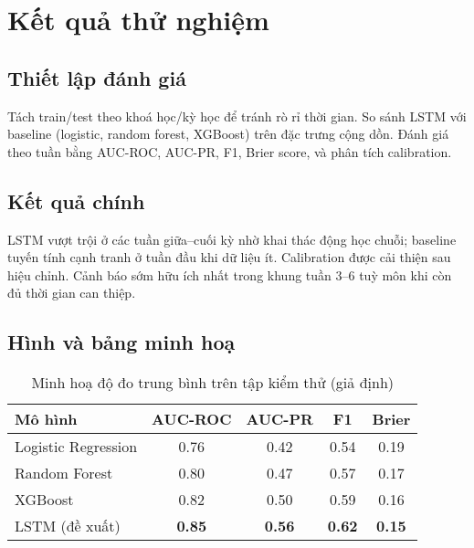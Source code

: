 \documentclass[12pt,a4paper]{article}
\begin{document}
\section{Kết quả thử nghiệm}
\subsection{Thiết lập đánh giá}
Tách train/test theo khoá học/kỳ học để tránh rò rỉ thời gian. So sánh LSTM với baseline (logistic, random forest, XGBoost) trên đặc trưng cộng dồn. Đánh giá theo tuần bằng AUC-ROC, AUC-PR, F1, Brier score, và phân tích calibration.

\subsection{Kết quả chính}
LSTM vượt trội ở các tuần giữa–cuối kỳ nhờ khai thác động học chuỗi; baseline tuyến tính cạnh tranh ở tuần đầu khi dữ liệu ít. Calibration được cải thiện sau hiệu chỉnh. Cảnh báo sớm hữu ích nhất trong khung tuần 3–6 tuỳ môn khi còn đủ thời gian can thiệp.

\subsection{Hình và bảng minh hoạ}

\begin{table}[H]
    \centering
    \caption{Minh hoạ độ đo trung bình trên tập kiểm thử (giả định)}
    \begin{tabular}{lcccc}
        \toprule
        Mô hình & AUC-ROC & AUC-PR & F1 & Brier \\
        \midrule
        Logistic Regression & 0.76 & 0.42 & 0.54 & 0.19 \\
        Random Forest & 0.80 & 0.47 & 0.57 & 0.17 \\
        XGBoost & 0.82 & 0.50 & 0.59 & 0.16 \\
        LSTM (đề xuất) & \textbf{0.85} & \textbf{0.56} & \textbf{0.62} & \textbf{0.15} \\
        \bottomrule
    \end{tabular}
    \label{tab:metrics}
\end{table}
\end{document}

